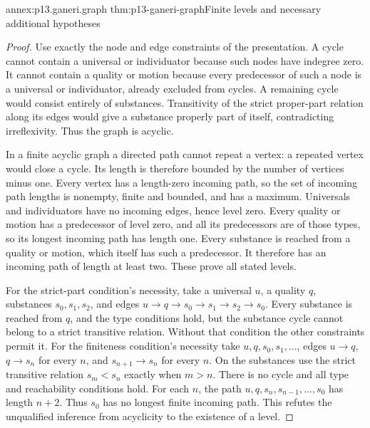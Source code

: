 \begin{annexitem}{annex:p13.ganeri.graph}
 {thm:p13-ganeri-graph}{Finite levels and necessary additional hypotheses}
\begin{proof}
Use exactly the node and edge constraints of the presentation.
A cycle cannot contain a universal or individuator because such nodes
have indegree zero. It cannot contain a quality or motion because every
predecessor of such a node is a universal or individuator, already
excluded from cycles. A remaining cycle would consist entirely of
substances. Transitivity of the strict proper-part relation along its
edges would give a substance properly part of itself, contradicting
irreflexivity. Thus the graph is acyclic.

In a finite acyclic graph a directed path cannot repeat a vertex:
a repeated vertex would close a cycle. Its length is therefore bounded
by the number of vertices minus one. Every vertex has a length-zero
incoming path, so the set of incoming path lengths is nonempty, finite
and bounded, and has a maximum.
Universals and individuators have no incoming edges, hence level zero.
Every quality or motion has a predecessor of level zero, and all
its predecessors are of those types, so its longest incoming path
has length one. Every substance is reached from a quality or motion,
which itself has such a predecessor. It therefore has an incoming
path of length at least two. These prove all stated levels.

For the strict-part condition's necessity, take a universal \(u\),
a quality \(q\), substances \(s_0,s_1,s_2\), and edges
\(u\to q\to s_0\to s_1\to s_2\to s_0\).
Every substance is reached from \(q\), and the type conditions hold,
but the substance cycle cannot belong to a strict transitive relation.
Without that condition the other constraints permit it.
For the finiteness condition's necessity take \(u,q,s_0,s_1,\ldots\),
edges \(u\to q\), \(q\to s_n\) for every \(n\), and
\(s_{n+1}\to s_n\) for every \(n\). On the substances use the
strict transitive relation \(s_m<s_n\) exactly when \(m>n\).
There is no cycle and all type and reachability conditions hold.
For each \(n\), the path
\(u,q,s_n,s_{n-1},\ldots,s_0\) has length \(n+2\).
Thus \(s_0\) has no longest finite incoming path. This refutes the
unqualified inference from acyclicity to the existence of a level.
\end{proof}
\end{annexitem}

